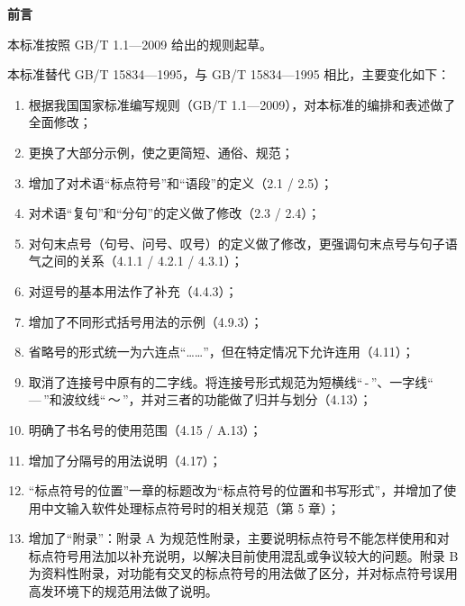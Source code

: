 \documentclass[a4paper]{article}
\begin{document}
\begin{multicols}{2}
    \tableofcontents
\end{multicols}

\thispagestyle{empty}


\newpage


\begin{center}
    \Large{\textbf{前\hspace{2em}言}}
\end{center}
\vspace{0.5cm}

{本标准按照 GB/T 1.1—2009 给出的规则起草。}

{本标准替代 GB/T 15834—1995，与 GB/T 15834—1995 相比，主要变化如下：}

\begin{enumerate}[label=——,labelsep=0pt,left=0em, align=left,topsep=1pt,parsep=1pt]
    \item 根据我国国家标准编写规则（GB/T 1.1—2009），对本标准的编排和表述做了全面修改；
    \item 更换了大部分示例，使之更简短、通俗、规范；
    \item 增加了对术语“标点符号”和“语段”的定义（2.1 / 2.5）；
    \item 对术语“复句”和“分句”的定义做了修改（2.3 / 2.4）；
    \item 对句末点号（句号、问号、叹号）的定义做了修改，更强调句末点号与句子语气之间的关系（4.1.1 / 4.2.1 / 4.3.1）；
    \item 对逗号的基本用法作了补充（4.4.3）；
    \item 增加了不同形式括号用法的示例（4.9.3）；
    \item 省略号的形式统一为六连点“……”，但在特定情况下允许连用（4.11）；
    \item 取消了连接号中原有的二字线。将连接号形式规范为短横线“\,-\,”、一字线“\,—\,”和波纹线“\,～\,”，并对三者的功能做了归并与划分（4.13）；
    \item 明确了书名号的使用范围（4.15 / A.13）；
    \item 增加了分隔号的用法说明（4.17）；
    \item \;“标点符号的位置”一章的标题改为“标点符号的位置和书写形式”，并增加了使用中文输入软件处理标点符号时的相关规范（第 5 章）；
    \item 增加了“附录”：附录 A 为规范性附录，主要说明标点符号不能怎样使用和对标点符号用法加以补充说明，以解决目前使用混乱或争议较大的问题。附录 B 为资料性附录，对功能有交叉的标点符号的用法做了区分，并对标点符号误用高发环境下的规范用法做了说明。
\end{enumerate}
\end{document}
